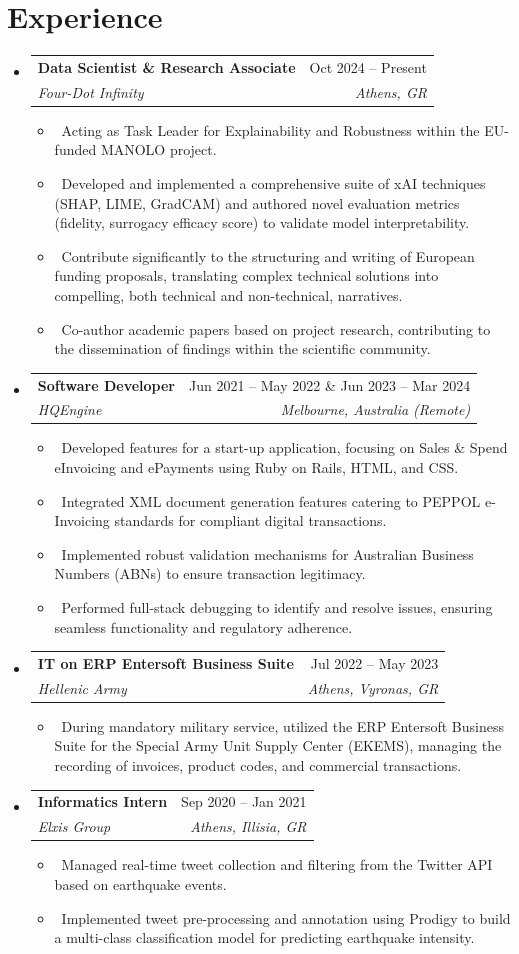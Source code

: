 \documentclass[letterpaper,10pt]{article}
\makeatletter
\newcommand{\resumeItem}[1]{\item\small{#1}}
\newcommand{\resumeSubheading}[4]{
\vspace{-1pt}\item
  \begin{tabular*}{0.97\textwidth}[t]{l@{\extracolsep{\fill}}r}
    \textbf{#1} & #2 \\
    \textit{#3} & \textit{#4} \\
  \end{tabular*}\vspace{-7pt}
}
\newcommand{\resumeSubHeadingList}{\begin{itemize}[leftmargin=0.15in, label={}]}
\newcommand{\resumeSubHeadingListEnd}{\end{itemize}}
\makeatother
\begin{document}
\section{Experience}
\resumeSubHeadingList
    \resumeSubheading
      {Data Scientist \& Research Associate}{Oct 2024 -- Present}
      {Four-Dot Infinity}{Athens, GR}
      \resumeSubHeadingList
          \resumeItem{\textbullet\ Acting as Task Leader for Explainability and Robustness within the EU-funded MANOLO project.}
          \resumeItem{\textbullet\ Developed and implemented a comprehensive suite of xAI techniques (SHAP, LIME, GradCAM) and authored novel evaluation metrics (fidelity, surrogacy efficacy score) to validate model interpretability.}
          \resumeItem{\textbullet\ Contribute significantly to the structuring and writing of European funding proposals, translating complex technical solutions into compelling, both technical and non-technical, narratives.}
          \resumeItem{\textbullet\ Co-author academic papers based on project research, contributing to the dissemination of findings within the scientific community.}
      \resumeSubHeadingListEnd
    \resumeSubheading
      {Software Developer}{Jun 2021 -- May 2022 \& Jun 2023 -- Mar 2024}
      {HQEngine}{Melbourne, Australia (Remote)}
      \resumeSubHeadingList
          \resumeItem{\textbullet\ Developed features for a start-up application, focusing on Sales \& Spend eInvoicing and ePayments using Ruby on Rails, HTML, and CSS.}
          \resumeItem{\textbullet\ Integrated XML document generation features catering to PEPPOL e-Invoicing standards for compliant digital transactions.}
          \resumeItem{\textbullet\ Implemented robust validation mechanisms for Australian Business Numbers (ABNs) to ensure transaction legitimacy.}
          \resumeItem{\textbullet\ Performed full-stack debugging to identify and resolve issues, ensuring seamless functionality and regulatory adherence.}
      \resumeSubHeadingListEnd
  \resumeSubheading
      {IT on ERP Entersoft Business Suite}{Jul 2022 -- May 2023}
      {Hellenic Army}{Athens, Vyronas, GR}
      \resumeSubHeadingList
          \resumeItem{\textbullet\ During mandatory military service, utilized the ERP Entersoft Business Suite for the Special Army Unit Supply Center (EKEMS), managing the recording of invoices, product codes, and commercial transactions.}
      \resumeSubHeadingListEnd
  \resumeSubheading
      {Informatics Intern}{Sep 2020 -- Jan 2021}
      {Elxis Group}{Athens, Illisia, GR}
      \resumeSubHeadingList
          \resumeItem{\textbullet\ Managed real-time tweet collection and filtering from the Twitter API based on earthquake events.}
          \resumeItem{\textbullet\ Implemented tweet pre-processing and annotation using Prodigy to build a multi-class classification model for predicting earthquake intensity.}
      \resumeSubHeadingListEnd
\resumeSubHeadingListEnd
\end{document}
